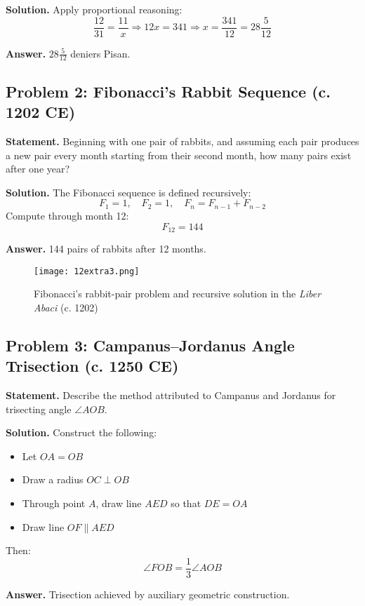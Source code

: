 \documentclass[9pt]{article}
\begin{document}
\textbf{Solution.} Apply proportional reasoning:
\[
\frac{12}{31} = \frac{11}{x} \Rightarrow 12x = 341 \Rightarrow x = \frac{341}{12} = 28\frac{5}{12}
\]

\textbf{Answer.} \(28\frac{5}{12}\) deniers Pisan.


\newpage

\subsection*{Problem 2: Fibonacci’s Rabbit Sequence (c. 1202 CE)}

\textbf{Statement.} Beginning with one pair of rabbits, and assuming each pair produces a new pair every month starting from their second month, how many pairs exist after one year?

\textbf{Solution.} The Fibonacci sequence is defined recursively:
\[
F_1 = 1,\quad F_2 = 1,\quad F_n = F_{n-1} + F_{n-2}
\]
Compute through month 12:
\[
F_{12} = 144
\]

\textbf{Answer.} 144 pairs of rabbits after 12 months.

\begin{figure}[H]
\centering
\texttt{[image: 12extra3.png]}
\caption{Fibonacci’s rabbit-pair problem and recursive solution in the \textit{Liber Abaci} (c. 1202)}
\end{figure}

\newpage

\subsection*{Problem 3: Campanus–Jordanus Angle Trisection (c. 1250 CE)}

\textbf{Statement.} Describe the method attributed to Campanus and Jordanus for trisecting angle \( \angle AOB \).

\textbf{Solution.} Construct the following:
\begin{itemize}
  \item Let \( OA = OB \)
  \item Draw a radius \( OC \perp OB \)
  \item Through point \( A \), draw line \( AED \) so that \( DE = OA \)
  \item Draw line \( OF \parallel AED \)
\end{itemize}
Then:
\[
\angle FOB = \frac{1}{3} \angle AOB
\]

\textbf{Answer.} Trisection achieved by auxiliary geometric construction.
\end{document}
